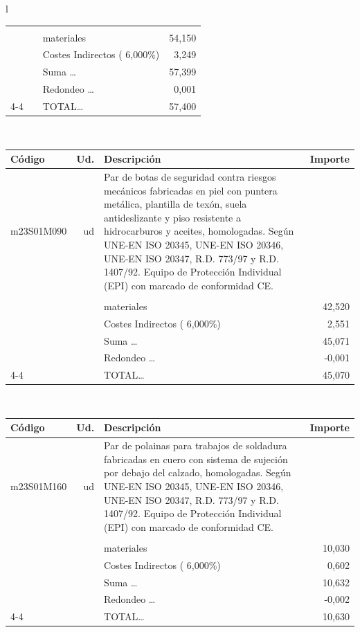 \documentclass{book}%
\begin{document}
\begin{longtable}{l}
\begin{tabular}{l r p{60mm} r}
&&&\\%
&&materiales&    54,150\\%
&&Costes Indirectos (     6,000\%)&     3,249\\%
&&Suma \ldots&    57,399\\%
&&Redondeo \ldots&     0,001\\%
\cline{4-4}%
&&TOTAL\ldots&    57,400\\%
\end{tabular}\\%
\begin{tabular}{l r p{60mm} r}%
Código&Ud.&Descripción&Importe\\%
\hline%
m23S01M090&ud&Par de botas de seguridad contra riesgos mecánicos fabricadas en piel con puntera metálica, plantilla de texón, suela antideslizante y piso resistente a hidrocarburos y aceites, homologadas. Según UNE{-}EN ISO 20345, UNE{-}EN ISO 20346, UNE{-}EN ISO 20347, R.D. 773/97 y R.D. 1407/92. Equipo de Protección Individual (EPI) con marcado de conformidad CE.&\\%
&&&\\%
&&materiales&    42,520\\%
&&Costes Indirectos (     6,000\%)&     2,551\\%
&&Suma \ldots&    45,071\\%
&&Redondeo \ldots&    {-}0,001\\%
\cline{4-4}%
&&TOTAL\ldots&    45,070\\%
\end{tabular}\\%
\begin{tabular}{l r p{60mm} r}%
Código&Ud.&Descripción&Importe\\%
\hline%
m23S01M160&ud&Par de polainas para trabajos de soldadura fabricadas en cuero con sistema de sujeción por debajo del calzado, homologadas. Según UNE{-}EN ISO 20345, UNE{-}EN ISO 20346, UNE{-}EN ISO 20347, R.D. 773/97 y R.D. 1407/92. Equipo de Protección Individual (EPI) con marcado de conformidad CE.&\\%
&&&\\%
&&materiales&    10,030\\%
&&Costes Indirectos (     6,000\%)&     0,602\\%
&&Suma \ldots&    10,632\\%
&&Redondeo \ldots&    {-}0,002\\%
\cline{4-4}%
&&TOTAL\ldots&    10,630\\%
\end{tabular}\\%

\end{longtable}
\end{document}
